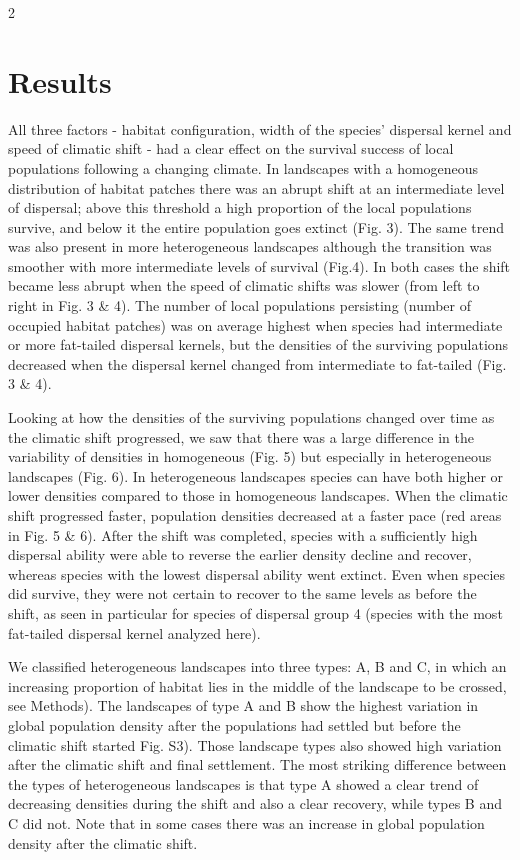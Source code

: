 \documentclass[12pt,pdftex]{article}
\begin{document}
\begin{spacing}{2}
\section*{Results}
All three factors - habitat configuration, width of the species’ dispersal kernel and speed of climatic shift - had a clear effect on the survival success of local populations following a changing climate. In landscapes with a homogeneous distribution of habitat patches there was an abrupt shift at an intermediate level of dispersal; above this threshold a high proportion of the local populations survive, and below it the entire population goes extinct (Fig. 3). The same trend was also present in more heterogeneous landscapes although the transition was smoother with more intermediate levels of survival (Fig.4). In both cases the shift became less abrupt when the speed of climatic shifts was slower (from left to right in Fig. 3 \& 4). The number of local populations persisting (number of occupied habitat patches) was on average highest when species had intermediate or more fat-tailed dispersal kernels, but the densities of the surviving populations decreased when the dispersal kernel changed from intermediate to fat-tailed (Fig. 3 \& 4). 


Looking at how the densities of the surviving populations changed over time as the climatic shift progressed, we saw that there was a large difference in the variability of densities in homogeneous (Fig. 5) but especially in heterogeneous landscapes (Fig. 6). In heterogeneous landscapes species can have both higher or lower densities compared to those in homogeneous landscapes. When the climatic shift progressed faster, population densities decreased at a faster pace (red areas in Fig. 5 \& 6). After the shift was completed, species with a sufficiently high dispersal ability were able to reverse the earlier density decline and recover, whereas species with the lowest dispersal ability went extinct. Even when species did survive, they were not certain to recover to the same levels as before the shift, as seen in particular for species of dispersal group 4 (species with the most fat-tailed dispersal kernel analyzed here).


We classified heterogeneous landscapes into three types: A, B and C, in which an increasing proportion of habitat lies in the middle of the landscape to be crossed, see Methods). The landscapes of type A and B show the highest variation in global population density after the populations had settled but before the climatic shift started Fig. S3). Those landscape types also showed high variation after the climatic shift and final settlement. The most striking difference between the types of heterogeneous landscapes is that type A showed a clear trend of decreasing densities during the shift and also a clear recovery, while types B and C did not. Note that in some cases there was an increase in global population density after the climatic shift.     



\end{spacing}
\end{document}
